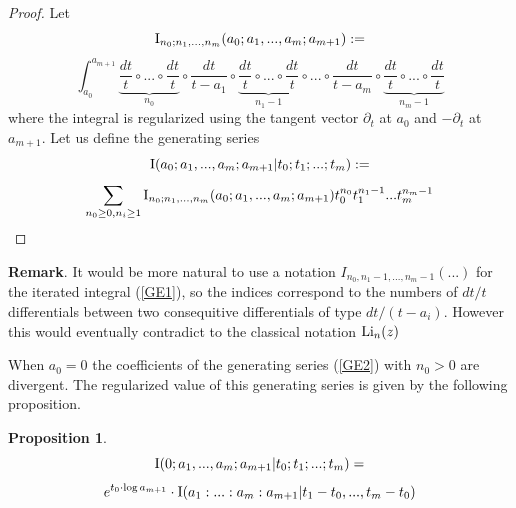 \documentclass[10pt]{article}
\newtheorem{proposition}[theorem]{Proposition}
\begin{document}
\begin{proof}
Let
\begin{equation} \label{GE1}
{\rm I}_{n_0; n_1, ..., n_m}(a_0; a_1, ..., a_m;a_{m+1}):=
\end{equation}
$$
\int_{a_0}^{a_{m+1}} \underbrace{\frac{dt}{t} \circ ... \circ \frac{dt}{t}}_{n_0} 
\circ
\frac{dt}{t-a_1} \circ \underbrace{\frac{dt}{t} \circ ... \circ \frac{dt}{t}}_{n_1-1} \circ ... \circ 
\frac{dt}{t-a_m} \circ 
\underbrace{\frac{dt}{t} \circ ... \circ \frac{dt}{t}}_{n_m-1}
$$
where the integral is regularized using the tangent vector $\partial_t$ at $a_0$ and 
$-\partial_t$ at $a_{m+1}$.
Let us define the generating series 
\begin{equation} \label{GE2}
{\rm I}(a_0; a_1, ..., a_m; a_{m+1}| t_0; t_1; ... ; t_m):= 
\end{equation}
$$
\sum_{n_0 \geq 0, n_i \geq 1} {\rm I}_{n_0; n_1, ..., n_m}(a_0; a_1, ..., a_m;a_{m+1})
t_0^{n_0} t_1^{n_1-1} ... t_m^{n_m-1}  
$$


\end{proof}

{\bf Remark}. It would be more natural to use a notation 
$I_{n_0, n_1-1, ..., n_m-1}(...)$ for the iterated integral 
(\ref{GE1}), so the indices correspond to the numbers of $dt/t$ differentials 
between two consequitive differentials of type $dt/(t-a_i)$. 
However this would eventually contradict to the classical notation ${\rm Li}_n(z)$

When $a_0=0$ the coefficients of the generating series (\ref{GE2}) 
with $n_0 >0$ are divergent. The regularized value of  
this generating series is given by the following proposition.

\begin{proposition} \label{GENP}
$$
{\rm I}(0; a_1, ..., a_m; a_{m+1}| t_0; t_1; ... ; t_m) = 
$$
\begin{equation} \label{3.10.01.1}
e^{t_0 \cdot \log a_{m+1}  } \cdot {\rm I}(a_1: ...: a_m: a_{m+1}| t_1 - t_0, ... , t_m  - t_0) 
\end{equation}
\end{proposition}
\end{document}
